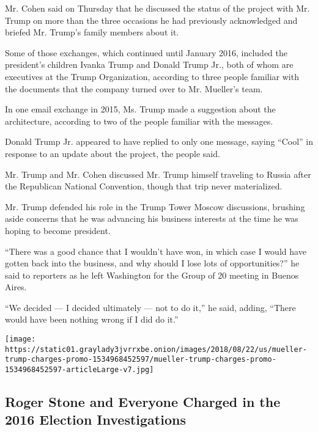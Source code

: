 Mr. Cohen said on Thursday that he discussed the status of the project
with Mr. Trump on more than the three occasions he had previously
acknowledged and briefed Mr. Trump's family members about it.

Some of those exchanges, which continued until January 2016, included
the president's children Ivanka Trump and Donald Trump Jr., both of whom
are executives at the Trump Organization, according to three people
familiar with the documents that the company turned over to Mr.
Mueller's team.

In one email exchange in 2015, Ms. Trump made a suggestion about the
architecture, according to two of the people familiar with the messages.

Donald Trump Jr. appeared to have replied to only one message, saying
``Cool'' in response to an update about the project, the people said.

Mr. Trump and Mr. Cohen discussed Mr. Trump himself traveling to Russia
after the Republican National Convention, though that trip never
materialized.

Mr. Trump defended his role in the Trump Tower Moscow discussions,
brushing aside concerns that he was advancing his business interests at
the time he was hoping to become president.

``There was a good chance that I wouldn't have won, in which case I
would have gotten back into the business, and why should I lose lots of
opportunities?'' he said to reporters as he left Washington for the
Group of 20 meeting in Buenos Aires.

``We decided --- I decided ultimately --- not to do it,'' he said,
adding, ``There would have been nothing wrong if I did do it.''

\href{https://www.nytimes3xbfgragh.onion/interactive/2018/08/21/us/mueller-trump-charges.html}{}

\texttt{[image: https://static01.graylady3jvrrxbe.onion/images/2018/08/22/us/mueller-trump-charges-promo-1534968452597/mueller-trump-charges-promo-1534968452597-articleLarge-v7.jpg]}

\hypertarget{roger-stone-and-everyone-charged-in-the-2016-election-investigations}{%
\subsection{Roger Stone and Everyone Charged in the 2016 Election
Investigations}\label{roger-stone-and-everyone-charged-in-the-2016-election-investigations}}

